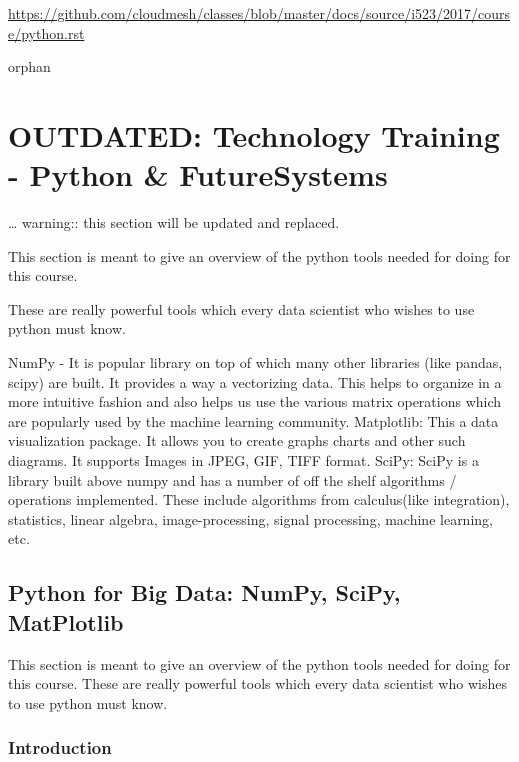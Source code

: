 \begin{fileremark}\url{https://github.com/cloudmesh/classes/blob/master/docs/source/i523/2017/course/python.rst}\end{fileremark}
\begin{description}
\item[orphan]
\end{description}

\section{OUTDATED: Technology Training - Python \&
FutureSystems}\label{outdated-technology-training---python-futuresystems}

\ldots{} warning:: this section will be updated and replaced.

This section is meant to give an overview of the python tools needed for
doing for this course.

These are really powerful tools which every data scientist who wishes to
use python must know.

NumPy - It is popular library on top of which many other libraries (like
pandas, scipy) are built. It provides a way a vectorizing data. This
helps to organize in a more intuitive fashion and also helps us use the
various matrix operations which are popularly used by the machine
learning community. Matplotlib: This a data visualization package. It
allows you to create graphs charts and other such diagrams. It supports
Images in JPEG, GIF, TIFF format. SciPy: SciPy is a library built above
numpy and has a number of off the shelf algorithms / operations
implemented. These include algorithms from calculus(like integration),
statistics, linear algebra, image-processing, signal processing, machine
learning, etc.

\subsection{Python for Big Data: NumPy, SciPy,
MatPlotlib}\label{python-for-big-data-numpy-scipy-matplotlib}

This section is meant to give an overview of the python tools needed for
doing for this course. These are really powerful tools which every data
scientist who wishes to use python must know.

\subsubsection{Introduction}\label{introduction}


